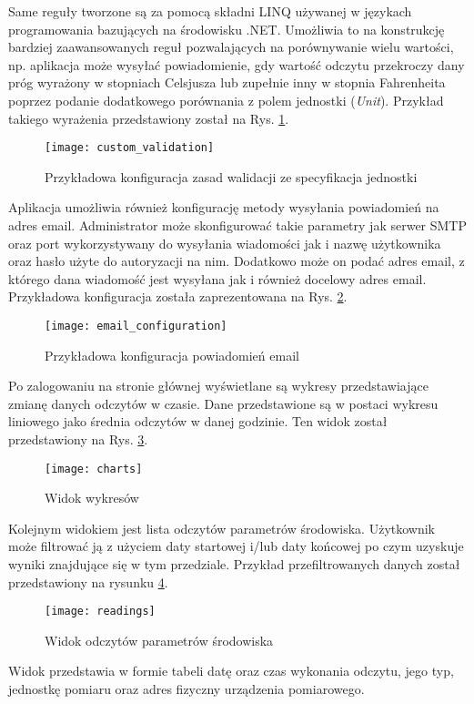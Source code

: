Same reguły tworzone są za pomocą składni LINQ używanej w językach programowania
bazujących na środowisku .NET. Umożliwia to na konstrukcję bardziej zaawansowanych reguł
pozwalających na porównywanie wielu wartości, np. aplikacja może wysyłać powiadomienie, gdy
wartość odczytu przekroczy dany próg wyrażony w stopniach Celsjusza lub zupełnie inny
w stopnia Fahrenheita poprzez podanie dodatkowego porównania z polem jednostki (\textit{Unit}).
Przykład takiego wyrażenia przedstawiony został na Rys. \ref{atmosphere:custom_validation}.
\begin{figure}[h!]
  \centering
  \texttt{[image: custom\_validation]}
  \caption{Przykładowa konfiguracja zasad walidacji ze specyfikacja jednostki}
  \label{atmosphere:custom_validation}
\end{figure}
Aplikacja umożliwia również konfigurację metody wysyłania powiadomień na adres email.
Administrator może skonfigurować takie parametry jak serwer SMTP oraz port wykorzystywany
do wysyłania wiadomości jak i nazwę użytkownika oraz hasło użyte do autoryzacji na nim.
Dodatkowo może on podać adres email, z którego dana wiadomość jest wysyłana jak i również
docelowy adres email. Przykładowa konfiguracja została zaprezentowana na Rys. \ref{atmosphere:email_configuration}.
\begin{figure}[h!]
  \centering
  \texttt{[image: email\_configuration]}
  \caption{Przykładowa konfiguracja powiadomień email}
  \label{atmosphere:email_configuration}
\end{figure}

Po zalogowaniu na stronie głównej wyświetlane są wykresy przedstawiające zmianę danych odczytów w czasie.
Dane przedstawione są w postaci wykresu liniowego jako średnia odczytów w danej godzinie.
Ten widok został przedstawiony na Rys. \ref{atmosphere:charts}.
\begin{figure}[h!]
  \centering
  \texttt{[image: charts]}
  \caption{Widok wykresów}
  \label{atmosphere:charts}
\end{figure}

Kolejnym widokiem jest lista odczytów parametrów środowiska. Użytkownik może 
filtrować ją z użyciem daty startowej i/lub daty końcowej po czym uzyskuje
wyniki znajdujące się w tym przedziale. Przykład przefiltrowanych danych
został przedstawiony na rysunku \ref{atmosphere:readings}.
\begin{figure}[h!]
  \centering
  \texttt{[image: readings]}
  \caption{Widok odczytów parametrów środowiska}
  \label{atmosphere:readings}
\end{figure}
Widok przedstawia w formie tabeli datę oraz czas wykonania odczytu, jego typ,
jednostkę pomiaru oraz adres fizyczny urządzenia pomiarowego.

